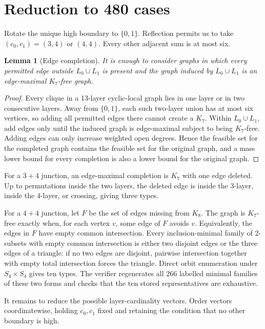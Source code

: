 \documentclass[11pt]{article}
\newtheorem{lemma}[theorem]{Lemma}
\theoremstyle{remark}
\begin{document}
\section{Reduction to 480 cases}

Rotate the unique high boundary to $\{0,1\}$.  Reflection permits us to take
$(c_0,c_1)=(3,4)$ or $(4,4)$.  Every other adjacent sum is at most six.

\begin{lemma}[Edge completion]\label{lem:completion}
It is enough to consider graphs in which every permitted edge outside
$L_0\cup L_1$ is present and the graph induced by $L_0\cup L_1$ is an
edge-maximal $K_7$-free graph.
\end{lemma}

\begin{proof}
Every clique in a 13-layer cyclic-local graph lies in one layer or in two
consecutive layers.  Away from $\{0,1\}$, each such two-layer union has at
most six vertices, so adding all permitted edges there cannot create a
$K_7$.  Within $L_0\cup L_1$, add edges only until the induced graph is
edge-maximal subject to being $K_7$-free.  Adding edges can only increase
weighted open degrees.  Hence the feasible set for the completed graph
contains the feasible set for the original graph, and a mass lower bound for
every completion is also a lower bound for the original graph.
\end{proof}

For a $3+4$ junction, an edge-maximal completion is $K_7$ with one edge
deleted.  Up to permutations inside the two layers, the deleted edge is
inside the 3-layer, inside the 4-layer, or crossing, giving three types.

For a $4+4$ junction, let $F$ be the set of edges missing from $K_8$.  The
graph is $K_7$-free exactly when, for each vertex $v$, some edge of $F$ avoids
$v$.  Equivalently, the edges in $F$ have empty common intersection.  Every
inclusion-minimal family of 2-subsets with empty common intersection is either
two disjoint edges or the three edges of a triangle: if no two edges are
disjoint, pairwise intersection together with empty total intersection forces
the triangle.  Direct orbit enumeration under $S_4\times S_4$ gives ten
types.  The verifier regenerates all 266 labelled minimal families of these
two forms and checks that the ten stored representatives are exhaustive.

It remains to reduce the possible layer-cardinality vectors.  Order vectors
coordinatewise, holding $c_0,c_1$ fixed and retaining the condition that no
other boundary is high.
\end{document}
